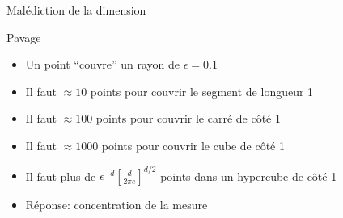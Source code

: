 \documentclass[presentation, aspectratio=169]{beamer}
\begin{document}
\begin{frame}[squeeze]{Malédiction de la dimension}
  \begin{block}{Pavage}
    \begin{itemize}
    \item Un point ``couvre'' un rayon de $\epsilon=0.1$
    \item Il faut $\approx10$ points pour couvrir le segment de
      longueur 1
    \item Il faut $\approx100$ points pour couvrir le carré de côté 1
    \item Il faut $\approx1000$ points pour couvrir le cube de côté 1
    \item Il faut plus de $\epsilon^{-d}\left[\frac d{2\pi
          e}\right]^{d/2}$ points dans un hypercube de côté 1
    \item \alert{Réponse: concentration de la mesure}
    \end{itemize}
  \end{block}


\end{frame}
\end{document}
